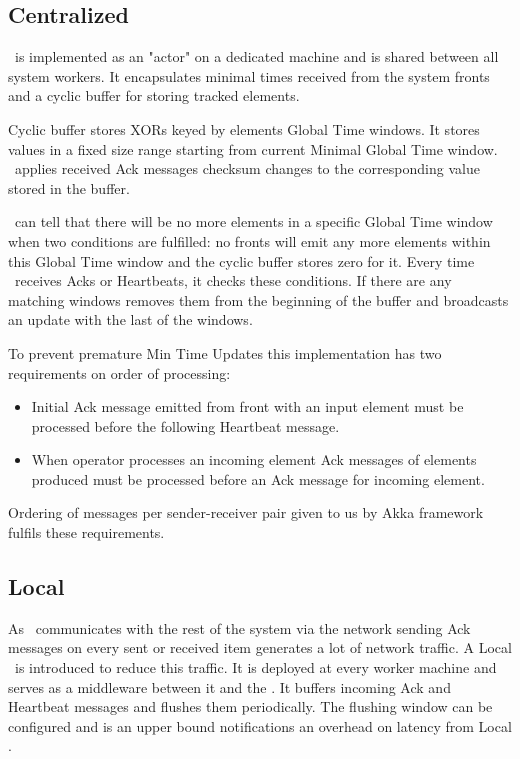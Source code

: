 \subsection{Centralized \tracker\ }

\tracker\ is implemented as an "actor" on a dedicated machine and is shared between all system workers. It encapsulates minimal times received from the system fronts and a cyclic buffer for storing tracked elements.

Cyclic buffer stores XORs keyed by elements Global Time windows. It stores values in a fixed size range starting from current Minimal Global Time window. \tracker\ applies received Ack messages checksum changes to the corresponding value stored in the buffer.

\tracker\ can tell that there will be no more elements in a specific Global Time window when two conditions are fulfilled: no fronts will emit any more elements within this Global Time window and the cyclic buffer stores zero for it. Every time \tracker\ receives Acks or Heartbeats, it checks these conditions. If there are any matching windows \tracker removes them from the beginning of the buffer and broadcasts an update with the last of the windows.

To prevent premature Min Time Updates this implementation has two requirements on order of processing:

\begin{itemize}
	\item Initial Ack message emitted from front with an input element must be processed before the following Heartbeat message.
	\item When operator processes an incoming element Ack messages of elements produced must be processed before an Ack message for incoming element.
\end{itemize}

Ordering of messages per sender-receiver pair given to us by Akka framework fulfils these requirements.

\subsection{Local \tracker\ }

As \tracker\ communicates with the rest of the system via the network sending Ack messages on every sent or received item generates a lot of network traffic. A Local \tracker\ is introduced to reduce this traffic. It is deployed at every worker machine and serves as a middleware between it and the \tracker. It buffers incoming Ack and Heartbeat messages and flushes them periodically. The flushing window can be configured and  is an upper bound notifications an overhead on latency from Local \tracker.

